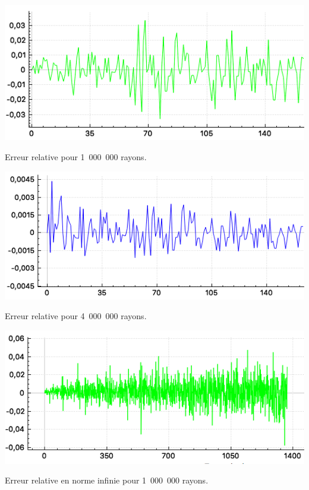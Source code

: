 \begin{figureth}
	\begin{subfigureth}{0.8\textwidth}
		\includegraphics[width=\linewidth]{images/test3_1}
		\caption{Erreur relative pour 1~000~000 rayons.}
		\label{test3_1}
	\end{subfigureth}
	\begin{subfigureth}{0.8\textwidth}
		\includegraphics[width=\linewidth]{images/test3_2}
		\caption{Erreur relative pour 4~000~000 rayons.}
		\label{test3_2}
	\end{subfigureth}
	\begin{subfigureth}{0.8\textwidth}
		\includegraphics[width=\linewidth]{images/test3_3}
		\caption{Erreur relative en norme infinie pour 1~000~000 rayons.}
		\label{test3_3}
	\end{subfigureth}
	\begin{subfigureth}{0.8\textwidth}

\end{subfigureth}
\end{figureth}
